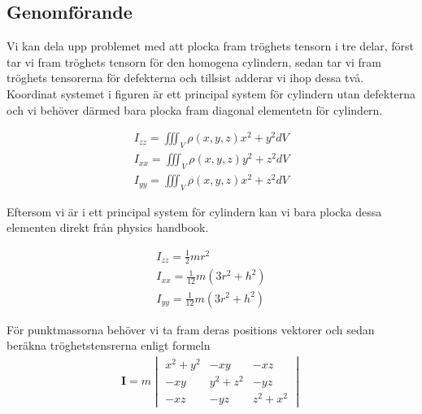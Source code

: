 \documentclass[a4paper]{article}
\begin{document}
\subsection*{Genomförande}

Vi kan dela upp problemet med att plocka fram tröghets tensorn i tre delar, först tar vi fram tröghets tensorn för den homogena cylindern, sedan tar vi fram tröghets tensorerna för defekterna och tillsist adderar vi ihop dessa två. Koordinat systemet i figuren är ett principal system för cylindern utan defekterna och vi behöver därmed bara plocka fram diagonal elementetn för cylindern.

\begin{align*}
    I_{zz} = \iiint_{V} \rho(x,y,z) x^2+y^2 dV \\
    I_{xx} = \iiint_{V} \rho(x,y,z) y^2+z^2 dV \\
    I_{yy} = \iiint_{V} \rho(x,y,z) x^2+z^2 dV
\end{align*}

Eftersom vi är i ett principal system för cylindern kan vi bara plocka dessa elementen direkt från physics handbook. 

\begin{align*}
    I_{zz} = \frac{1}{2} m r^2 \\
    I_{xx} = \frac{1}{12} m (3r^2 + h^2) \\
    I_{yy} = \frac{1}{12} m (3r^2 + h^2)
\end{align*}

För punktmassorna behöver vi ta fram deras positions vektorer och sedan beräkna tröghetstensrerna enligt formeln
\begin{align*}
    \mathbf{I} = m \begin{vmatrix}
        x^2 + y^2 & -xy & -xz \\
        -xy & y^2 + z^2 & -yz \\
        -xz & -yz & z^2 + x^2
    \end{vmatrix}
\end{align*}
\end{document}

